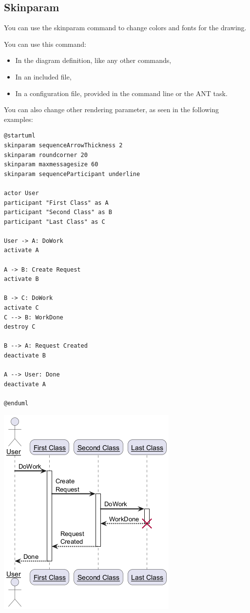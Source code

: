 %
%
\subsection{Skinparam}




You can use the skinparam
command to change colors and fonts for the drawing.




You can use this command:
\begin{itemize}
\item In the diagram definition, like any other commands,
\item In an included file,
\item In a configuration file, provided in the command line or the ANT task.
\end{itemize}


You can also change other rendering parameter, as seen in the following examples:


\begin{verbatim}
@startuml
skinparam sequenceArrowThickness 2
skinparam roundcorner 20
skinparam maxmessagesize 60
skinparam sequenceParticipant underline

actor User
participant "First Class" as A
participant "Second Class" as B
participant "Last Class" as C

User -> A: DoWork
activate A

A -> B: Create Request
activate B

B -> C: DoWork
activate C
C --> B: WorkDone
destroy C

B --> A: Request Created
deactivate B

A --> User: Done
deactivate A

@enduml
\end{verbatim}
\begin{center}
\includegraphics[scale=0.60]{imgw/img-2ac222a5f0868a3e370e7271c766e034.png}
\end{center}


